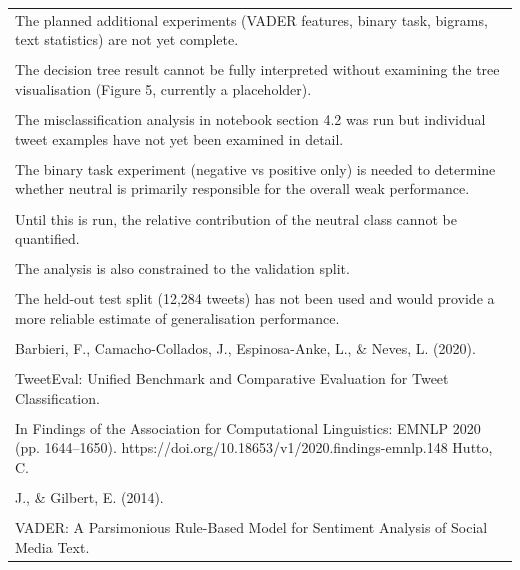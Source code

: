 \documentclass[11pt,a4paper,landscape]{article}
\begin{document}
\begin{longtable}{|p{\dimexpr\linewidth-2\tabcolsep-2\arrayrulewidth\relax}|}
\hline
\rule{0pt}{3.5cm} \\
\hline
The planned additional experiments (VADER features, binary task, bigrams, text statistics) are not yet complete. \\[2pt]
\hline
\rule{0pt}{3.5cm} \\
\hline
The decision tree result cannot be fully interpreted without examining the tree visualisation (Figure 5, currently a placeholder). \\[2pt]
\hline
\rule{0pt}{3.5cm} \\
\hline
The misclassification analysis in notebook section 4.2 was run but individual tweet examples have not yet been examined in detail. \\[2pt]
\hline
\rule{0pt}{3.5cm} \\
\hline
The binary task experiment (negative vs positive only) is needed to determine whether neutral is primarily responsible for the overall weak performance. \\[2pt]
\hline
\rule{0pt}{3.5cm} \\
\hline
Until this is run, the relative contribution of the neutral class cannot be quantified. \\[2pt]
\hline
\rule{0pt}{3.5cm} \\
\hline
The analysis is also constrained to the validation split. \\[2pt]
\hline
\rule{0pt}{3.5cm} \\
\hline
The held-out test split (12,284 tweets) has not been used and would provide a more reliable estimate of generalisation performance. \\[2pt]
\hline
\rule{0pt}{3.5cm} \\
\hline
Barbieri, F., Camacho-Collados, J., Espinosa-Anke, L., \& Neves, L. (2020). \\[2pt]
\hline
\rule{0pt}{3.5cm} \\
\hline
TweetEval: Unified Benchmark and Comparative Evaluation for Tweet Classification. \\[2pt]
\hline
\rule{0pt}{3.5cm} \\
\hline
In Findings of the Association for Computational Linguistics: EMNLP 2020 (pp. 1644--1650). https://doi.org/10.18653/v1/2020.findings-emnlp.148 Hutto, C. \\[2pt]
\hline
\rule{0pt}{3.5cm} \\
\hline
J., \& Gilbert, E. (2014). \\[2pt]
\hline
\rule{0pt}{3.5cm} \\
\hline
VADER: A Parsimonious Rule-Based Model for Sentiment Analysis of Social Media Text. \\[2pt]

\end{longtable}
\end{document}
